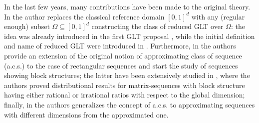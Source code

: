 \documentclass{amsart}
\begin{document}
In the last few years, many contributions have been made to the original theory. In \cite{Barb} the author replaces the classical reference domain $[0,1]^d$ with any (regular enough) subset $\Omega \subseteq [0,1]^d$ constructing the class of reduced GLT over $\Omega$: the idea was already introduced in the first GLT proposal \cite[pp. 398-399]{glt-laa}, while the initial definition and name of reduced GLT were introduced in \cite[Section 3.1.4]{glt-Fourier}. Furthermore, in \cite{BGMS} the authors provide an extension of the original notion of approximating class of sequence (a.c.s.) to the case of rectangular sequences and start the study of sequences showing block structures; the latter have been extensively studied in \cite{AFGS26,AGS26,ASPSC25,BFFS}, where the authors proved distributional results for matrix-sequences with block structure having either rational or irrational ratios with respect to the global dimension; finally, in \cite{gacs} the authors generalizes the concept of a.c.s. to approximating sequences with different dimensions from the approximated one.
\end{document}
